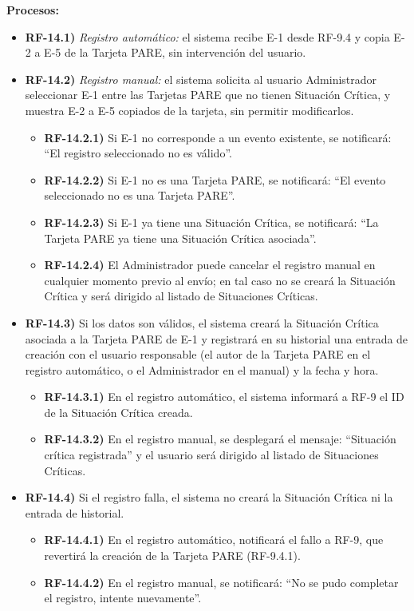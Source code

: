 \textbf{Procesos:}
\begin{itemize}[label={}, leftmargin=1.5em]
  \item \textbf{RF-14.1)} \textit{Registro autom\'atico:} el sistema recibe E-1 desde RF-9.4 y copia E-2 a E-5 de la Tarjeta PARE, sin intervenci\'on del usuario.
  \item \textbf{RF-14.2)} \textit{Registro manual:} el sistema solicita al usuario Administrador seleccionar E-1 entre las Tarjetas PARE que no tienen Situaci\'on Cr\'itica, y muestra E-2 a E-5 copiados de la tarjeta, sin permitir modificarlos.
  \begin{itemize}[label={}, leftmargin=1.5em]
    \item \textbf{RF-14.2.1)} Si E-1 no corresponde a un evento existente, se notificar\'a: ``El registro seleccionado no es v\'alido''.
    \item \textbf{RF-14.2.2)} Si E-1 no es una Tarjeta PARE, se notificar\'a: ``El evento seleccionado no es una Tarjeta PARE''.
    \item \textbf{RF-14.2.3)} Si E-1 ya tiene una Situaci\'on Cr\'itica, se notificar\'a: ``La Tarjeta PARE ya tiene una Situaci\'on Cr\'itica asociada''.
    \item \textbf{RF-14.2.4)} El Administrador puede cancelar el registro manual en cualquier momento previo al env\'io; en tal caso no se crear\'a la Situaci\'on Cr\'itica y ser\'a dirigido al listado de Situaciones Cr\'iticas.
  \end{itemize}
  \item \textbf{RF-14.3)} Si los datos son v\'alidos, el sistema crear\'a la Situaci\'on Cr\'itica asociada a la Tarjeta PARE de E-1 y registrar\'a en su historial una entrada de creaci\'on con el usuario responsable (el autor de la Tarjeta PARE en el registro autom\'atico, o el Administrador en el manual) y la fecha y hora.
  \begin{itemize}[label={}, leftmargin=1.5em]
    \item \textbf{RF-14.3.1)} En el registro autom\'atico, el sistema informar\'a a RF-9 el ID de la Situaci\'on Cr\'itica creada.
    \item \textbf{RF-14.3.2)} En el registro manual, se desplegar\'a el mensaje: ``Situaci\'on cr\'itica registrada'' y el usuario ser\'a dirigido al listado de Situaciones Cr\'iticas.
  \end{itemize}
  \item \textbf{RF-14.4)} Si el registro falla, el sistema no crear\'a la Situaci\'on Cr\'itica ni la entrada de historial.
  \begin{itemize}[label={}, leftmargin=1.5em]
    \item \textbf{RF-14.4.1)} En el registro autom\'atico, notificar\'a el fallo a RF-9, que revertir\'a la creaci\'on de la Tarjeta PARE (RF-9.4.1).
    \item \textbf{RF-14.4.2)} En el registro manual, se notificar\'a: ``No se pudo completar el registro, intente nuevamente''.
  \end{itemize}
\end{itemize}

